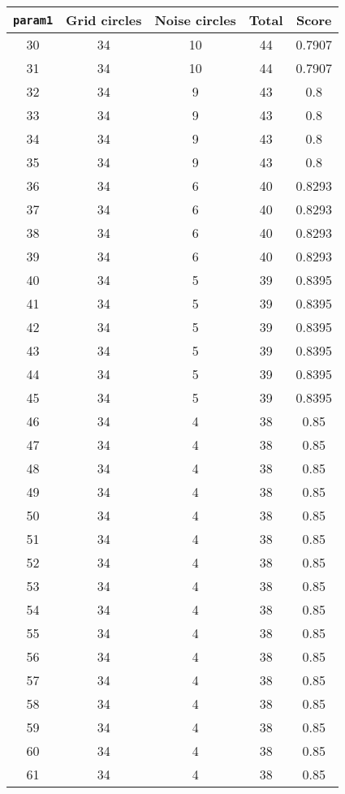 \documentclass[letterpaper, 12pt]{article}
\begin{document}
\begin{longtable}{|c|c|c|c|c|}
\hline
\textbf{\texttt{param1}} & \textbf{Grid circles} & \textbf{Noise circles} & \textbf{Total} & \textbf{Score} \\
\hline
30 & 34 & 10 & 44 & 0.7907 \\
\hline
31 & 34 & 10 & 44 & 0.7907 \\
\hline
32 & 34 & 9 & 43 & 0.8 \\
\hline
33 & 34 & 9 & 43 & 0.8 \\
\hline
34 & 34 & 9 & 43 & 0.8 \\
\hline
35 & 34 & 9 & 43 & 0.8 \\
\hline
36 & 34 & 6 & 40 & 0.8293 \\
\hline
37 & 34 & 6 & 40 & 0.8293 \\
\hline
38 & 34 & 6 & 40 & 0.8293 \\
\hline
39 & 34 & 6 & 40 & 0.8293 \\
\hline
40 & 34 & 5 & 39 & 0.8395 \\
\hline
41 & 34 & 5 & 39 & 0.8395 \\
\hline
42 & 34 & 5 & 39 & 0.8395 \\
\hline
43 & 34 & 5 & 39 & 0.8395 \\
\hline
44 & 34 & 5 & 39 & 0.8395 \\
\hline
45 & 34 & 5 & 39 & 0.8395 \\
\hline
46 & 34 & 4 & 38 & 0.85 \\
\hline
47 & 34 & 4 & 38 & 0.85 \\
\hline
48 & 34 & 4 & 38 & 0.85 \\
\hline
49 & 34 & 4 & 38 & 0.85 \\
\hline
50 & 34 & 4 & 38 & 0.85 \\
\hline
51 & 34 & 4 & 38 & 0.85 \\
\hline
52 & 34 & 4 & 38 & 0.85 \\
\hline
53 & 34 & 4 & 38 & 0.85 \\
\hline
54 & 34 & 4 & 38 & 0.85 \\
\hline
55 & 34 & 4 & 38 & 0.85 \\
\hline
56 & 34 & 4 & 38 & 0.85 \\
\hline
57 & 34 & 4 & 38 & 0.85 \\
\hline
58 & 34 & 4 & 38 & 0.85 \\
\hline
59 & 34 & 4 & 38 & 0.85 \\
\hline
60 & 34 & 4 & 38 & 0.85 \\
\hline
61 & 34 & 4 & 38 & 0.85 \\

\end{longtable}
\end{document}
